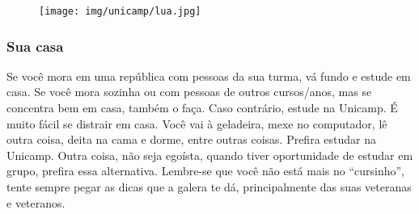 
\begin{figure}[h!]
  \centering
  \texttt{[image: img/unicamp/lua.jpg]}
\end{figure}

\subsubsection{Sua casa}

Se você mora em uma república com pessoas da sua turma, vá fundo e estude em
casa. Se você mora sozinha ou com pessoas de outros cursos/anos, mas se
concentra bem em casa, também o faça. Caso contrário, estude na Unicamp. É
muito fácil se distrair em casa. Você vai à geladeira, mexe no computador, lê
outra coisa, deita na cama e dorme, entre outras coisas. Prefira estudar na
Unicamp. Outra coisa, não seja egoísta, quando tiver oportunidade de estudar em
grupo, prefira essa alternativa. Lembre-se que você não está mais no
``cursinho'', tente sempre pegar as dicas que a galera te dá, principalmente
das suas veteranas e veteranos.
